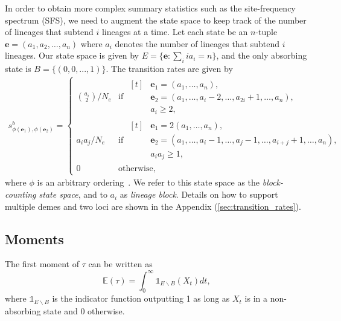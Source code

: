 \documentclass[hidelinks,11pt]{article}
\begin{document}
    In order to obtain more complex summary statistics such as the site-frequency spectrum (SFS), we need to augment the state space to keep track of the number of lineages that subtend $i$ lineages at a time.
    Let each state be an $n$-tuple $\mathbf{e}=(a_1, a_2, \dots, a_n)$ where $a_i$ denotes the number of lineages that subtend $i$ lineages.
    Our state space is given by $E=\{\mathbf{e}: \sum_i ia_i = n\}$, and the only absorbing state is $B=\{(0, 0, ..., 1)\}$.
    The transition rates are given by
    \begin{align*}
        s^b_{\phi(\mathbf{e}_1),\phi(\mathbf{e}_2)} =
        \begin{cases}
            \binom{a_i}{2} / N_e & \text{if }
            \begin{aligned}[t]
                & \mathbf{e}_1=(a_1,\dots,a_n), \\
                & \mathbf{e}_2=(a_1,\dots,a_i-2,\dots,a_{2i}+1,\dots,a_{n}), \\
                & a_i \geq 2,
            \end{aligned} \\
            a_i a_j / N_e & \text{if }
            \begin{aligned}[t]
                & \mathbf{e}_1=2(a_1,\dots,a_n), \\
                & \mathbf{e}_2=(a_1,\dots,a_i-1,\dots,a_j-1,\dots,a_{i+j}+1,\dots,a_{n}), \\
                & a_i a_j \geq 1,
            \end{aligned} \\
            0 & \text{otherwise,}
        \end{cases}
    \end{align*}
    where $\phi$ is an arbitrary ordering~\citep{phasetype_sfs}.
    We refer to this state space as the \textit{block-counting state space}, and to $a_i$ as \textit{lineage block}.
    Details on how to support multiple demes and two loci are shown in the Appendix (\ref{sec:transition_rates}).

    \subsection{Moments}\label{subsec:moments}

    The first moment of $\tau$ can be written as
    \begin{equation*}
        \mathds{E}(\tau) = \int_0^{\infty} \mathds{1}_{E \backslash B}(X_t) dt,
    \end{equation*}
    where $\mathds{1}_{E \backslash B}$ is the indicator function outputting 1 as long as $X_t$ is in a non-absorbing state and 0 otherwise.
\end{document}
